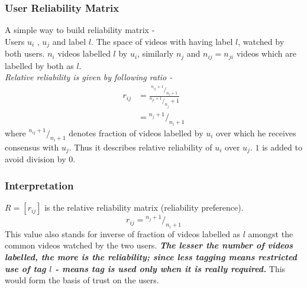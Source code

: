 \documentclass{beamer}
\newcommand*\rfrac[2]{{}^{#1}\!/_{#2}}
\begin{document}


\begin{frame}
\frametitle{User Reliability Matrix}
A simple way to build reliability matrix  - \\
Users $u_i$ , $u_j$ and label $l$. The space of videos with having label $l$, watched by both users. $n_i$ videos labelled $l$ by $u_i$, similarly $n_j$ and $n_{ij}=n_{ji}$ videos which are labelled by both as $l$.\\
\emph{ Relative reliability is given by following ratio - }\\
\begin{equation}
  \begin{split}
    r_{ij} & = \frac{\rfrac{n_{ij} + 1}{n_i + 1}}{\rfrac{n_{ji} + 1}{n_j} + 1}\\
    & = \rfrac{n_j + 1}{n_i + 1}
  \end{split}
\end{equation}
where $\rfrac{n_{ij} + 1}{n_i + 1}$ denotes fraction of videos labelled by $u_i$ over which he receives consensus with $u_j$. Thus it describes relative reliability of $u_i$ over $u_j$. $1$ is added to avoid division by $0$.
\end{frame}


\begin{frame}
\frametitle{Interpretation}
$R = [r_{ij}]$ is the relative reliability matrix (reliability preference). 
\begin{equation}
  r_{ij} = \rfrac{n_j + 1}{n_i + 1}
\end{equation}
This value also stands for inverse of fraction of videos labelled as $l$ amongst the common videos watched by the two users. \textbf{\emph{The lesser the number of videos labelled, the more is the reliability; since less tagging means restricted use of tag $l$ - means tag is used only when it is really required.}} This would form the basis of trust on the users.
\end{frame}

\end{document}
